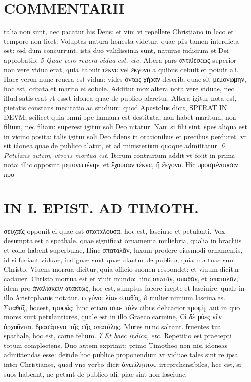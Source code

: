 \documentclass{article}
\begin{document}
\begin{pages}
\section*{COMMENTARII }
\marginpar{[ p.124 ]}\pstart talia non sunt, nec pacatur his Deus: et vim vi repellere Christiano in loco et tempore non licet. Voluptas natura honesta videtur, quae piis tamen interdicta est: sed dum concurrunt, ista duo validissima sunt, naturae iudicium et Dei approbatio.  \pend
\textit{5 Quae vero reuera vidua est, etc. }\pstart Altera pars ἀντιθέσεως superior non vere vidua erat, quia habuit τέκνα vel ἔκγονα a quibus debuit et potuit ali. Haec veron nunc reuera est vidua: vides ὄντως χήραν describi quae sit μεμονωμην, hoc est, orbata et marito et sobole. Additur mox altera nota vere viduae, nec illud satis erat vt esset idonea quae de publico aleretur. Altera igitur nota est, pietatis constans meditatio ac studium: quod Apostolus dicit, SPERAT IN DEVM, scilicet quia omni ope humana est destituta, non habet maritum, non filium, nec filiam: superest igitur soli Deo nitatur. Nam si filii sint, spes aliqua est in vicino posita: talis igitur soli Deo fidens in orationibus et precibus perduret, vt sit idonea quae de publico alatur, et ad ministerium quoque admittatur.  \pend
\textit{6 Petulans autem, vivens mortua est. }\pstart Iterum contrarium addit vt fecit in prima nota: illic opposuit μεμονωμένην, et ἔχουσαν τέκνα, ἤ ἔκγονα.  Hîc προσμένουσαν προ-  \pend
\section*{IN I. EPIST. AD TIMOTH. }
\marginpar{[ p.125 ]}\pstart σευχαῖς opponit ei quae est σπαταλουσα, hoc est, lasciuae et petulanti. Vox desumpta est a spathale, quae significat oruamenta muliebria, qualia in brachiis et collo habent superbulae, Hinc σπαταλᾶν, luxum prodere eiusmodi ornamentis, id si faciant viduae, indignae sunt quae alantur de publico, quia mortuae sunt Christo. Viuens morrua dicitur, quia officio suonon respondet: et viuum dicitur cadauer. Christo mortua est et viuit mundo: hinc σπaτᾶν, σπαθᾶν, et σπαταλᾶν, idem pro ἀναλίσκειν ἀτάκτως, hoc est, sumptus facere inepte et lasciuire: quale in illo Aristophanis notatur. ὦ γύναι λίαν σπαθᾶς, ô mulier nimium lasciua es. Σπαθα̃͂ς, hocest, τρυφᾶς: hinc etiam σπα- τάλν cibus delicacior προφὴ, aut in quo mores sunt petulantiores, quale est in illo Graeco carmine, Οἱ δὲ μύες νῦν ὀρχοῦνται, δρασάμενοι τῆς σῆς σπατάλης, Mures nunc saltant, fruentes tua spathale, hoc est, carne felium.  \pend
\textit{7 Et haec indica, etc. }\pstart Repetitio est praecepti totum complectens. Duo autem exprimit: primo Timotheo non nisi idoneas admittendas esse: deinde hoc publice proponendum vt viduae tales sint re ipsa inter Christianos, quod vno verbo dicit ἀνεπίληπτοι, irreprehensibiles, hoc est, si suos habeant, ne petant de publico ali, piae sint non lasciuae.  \pend

\end{pages}
\end{document}
